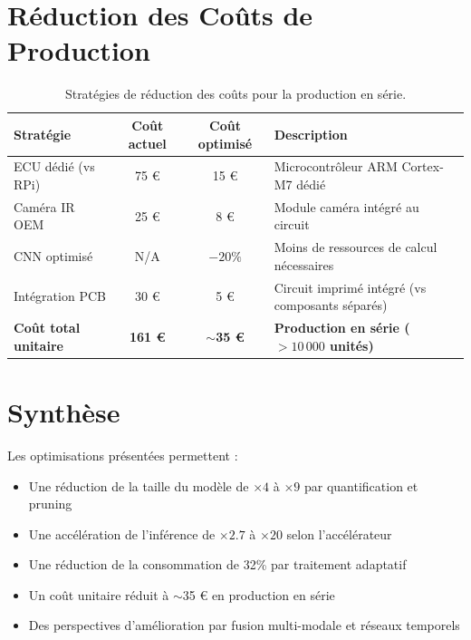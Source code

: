 \section{Réduction des Coûts de Production}

\begin{table}[H]
\centering
\caption{Stratégies de réduction des coûts pour la production en série.}
\label{tab:cost_reduction}
\renewcommand{\arraystretch}{1.4}
\begin{tabularx}{\textwidth}{|l|c|c|X|}
\hline
\rowcolor{stellantisblue!15}
\textbf{Stratégie} & \textbf{Coût actuel} & \textbf{Coût optimisé} & \textbf{Description} \\
\hline
ECU dédié (vs RPi) & 75 € & 15 € & Microcontrôleur ARM Cortex-M7 dédié \\
\hline
Caméra IR OEM & 25 € & 8 € & Module caméra intégré au circuit \\
\hline
CNN optimisé & N/A & $-20\%$ & Moins de ressources de calcul nécessaires \\
\hline
Intégration PCB & 30 € & 5 € & Circuit imprimé intégré (vs composants séparés) \\
\hline
\textbf{Coût total unitaire} & \textbf{161 €} & \textbf{$\sim$35 €} & \textbf{Production en série ($> 10\,000$ unités)} \\
\hline
\end{tabularx}
\end{table}

\section{Synthèse}

Les optimisations présentées permettent :
\begin{itemize}
    \item Une réduction de la taille du modèle de $\times 4$ à $\times 9$ par quantification et pruning
    \item Une accélération de l'inférence de $\times 2.7$ à $\times 20$ selon l'accélérateur
    \item Une réduction de la consommation de 32\% par traitement adaptatif
    \item Un coût unitaire réduit à $\sim$35 € en production en série
    \item Des perspectives d'amélioration par fusion multi-modale et réseaux temporels
\end{itemize}
